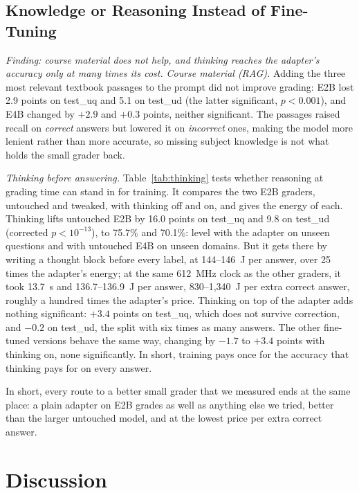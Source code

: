 \documentclass[journal]{IEEEtran}
\begin{document}
\subsection{Knowledge or Reasoning Instead of Fine-Tuning}
\label{sec:r-think}
\textit{Finding: course material does not help, and thinking reaches the adapter's accuracy only at many times its cost.}
\textit{Course material (RAG).}
Adding the three most relevant textbook passages to the prompt did not improve grading: E2B lost 2.9 points on test\_uq and 5.1 on test\_ud (the latter significant, $p<0.001$), and E4B changed by $+2.9$ and $+0.3$ points, neither significant.
The passages raised recall on \textit{correct} answers but lowered it on \textit{incorrect} ones, making the model more lenient rather than more accurate, so missing subject knowledge is not what holds the small grader back.

\textit{Thinking before answering.}
Table~\ref{tab:thinking} tests whether reasoning at grading time can stand in for training.
It compares the two E2B graders, untouched and tweaked, with thinking off and on, and gives the energy of each.
Thinking lifts untouched E2B by 16.0 points on test\_uq and 9.8 on test\_ud (corrected $p<10^{-13}$), to 75.7\% and 70.1\%: level with the adapter on unseen questions and with untouched E4B on unseen domains.
But it gets there by writing a thought block before every label, at 144--146~J per answer, over 25 times the adapter's energy; at the same 612~MHz clock as the other graders, it took 13.7~s and 136.7--136.9~J per answer, 830--1{,}340~J per extra correct answer, roughly a hundred times the adapter's price.
Thinking on top of the adapter adds nothing significant: $+3.4$ points on test\_uq, which does not survive correction, and $-0.2$ on test\_ud, the split with six times as many answers.
The other fine-tuned versions behave the same way, changing by $-1.7$ to $+3.4$ points with thinking on, none significantly.
In short, training pays once for the accuracy that thinking pays for on every answer.



In short, every route to a better small grader that we measured ends at the same place: a plain adapter on E2B grades as well as anything else we tried, better than the larger untouched model, and at the lowest price per extra correct answer.

\section{Discussion}
\label{sec:discussion}
\end{document}
